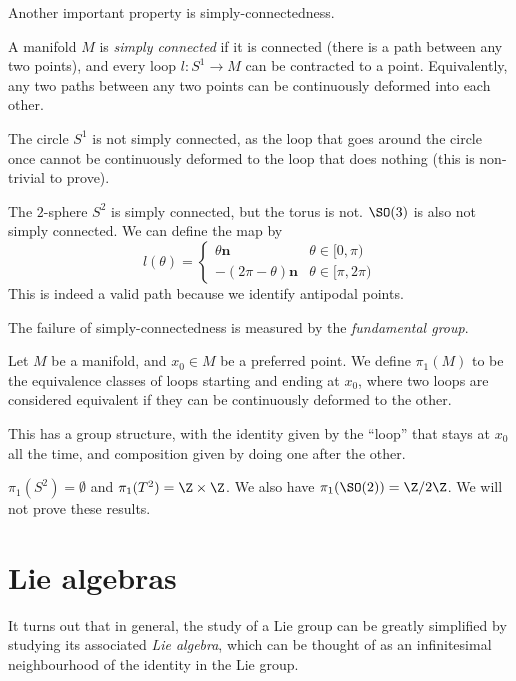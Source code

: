 \documentclass[a4paper]{article}
\begin{document}
Another important property is simply-connectedness.
\begin{defi}
  A manifold $M$ is \emph{simply connected} if it is connected (there is a path between any two points), and every loop $l: S^1 \to M$ can be contracted to a point. Equivalently, any two paths between any two points can be continuously deformed into each other.
\end{defi}

\begin{eg}
  The circle $S^1$ is not simply connected, as the loop that goes around the circle once cannot be continuously deformed to the loop that does nothing (this is non-trivial to prove).
\end{eg}

\begin{eg}
  The $2$-sphere $S^2$ is simply connected, but the torus is not. $\SO(3)$ is also not simply connected. We can define the map by
  \[
    l(\theta) =
    \begin{cases}
      \theta \mathbf{n} & \theta \in [0, \pi)\\
      -(2\pi - \theta) \mathbf{n} & \theta \in [\pi, 2\pi)
    \end{cases}
  \]
  This is indeed a valid path because we identify antipodal points.
\end{eg}

The failure of simply-connectedness is measured by the \emph{fundamental group}.
\begin{defi}
  Let $M$ be a manifold, and $x_0 \in M$ be a preferred point. We define $\pi_1(M)$ to be the equivalence classes of loops starting and ending at $x_0$, where two loops are considered equivalent if they can be continuously deformed to the other.

  This has a group structure, with the identity given by the ``loop'' that stays at $x_0$ all the time, and composition given by doing one after the other.
\end{defi}

\begin{eg}
  $\pi_1(S^2) = \emptyset$ and $\pi_1(T^2) = \Z \times \Z$. We also have $\pi_1(\SO(2)) = \Z/2\Z$. We will not prove these results.
\end{eg}


\section{Lie algebras}
It turns out that in general, the study of a Lie group can be greatly simplified by studying its associated \emph{Lie algebra}, which can be thought of as an infinitesimal neighbourhood of the identity in the Lie group.
\end{document}
